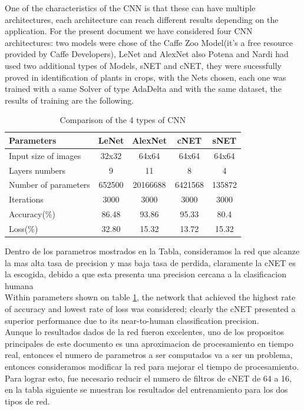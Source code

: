 \documentclass[conference]{IEEEtran}
\begin{document}
One of the characteristics of the CNN is that these can have multiple architectures, each architecture can reach different results depending on the application. For the present document we have considered four CNN architectures: two models were chose of the Caffe Zoo Model(it's a free resource provided by Caffe Developers), LeNet and AlexNet also Potena and Nardi had used two additional types of Models, sNET and cNET, they were sucessfully proved in identification of plants in crops\cite{potena2016fast}, with the Nets chosen, each one was trained with a same Solver of type AdaDelta and with the same dataset, the results of training are the following. \\
\begin{table}[h!]
\centering
\begin{tabular}{|l c c c c|} 
 \hline
 \textbf{Parameters }& \textbf{LeNet} & \textbf{AlexNet} & \textbf{cNET} & \textbf{sNET} \\ [0.75ex] 
 \hline
 Input size of images & 32x32 & 64x64 & 64x64 & 64x64 \\ 
 Layers numbers & 9 & 11 & 8 & 4\\
 Number of parameters & 652500 & 20166688 & 6421568 & 135872 \\ 
 Iterations & 3000 & 3000 & 3000 & 3000 \\ 
  Accuracy(\%) & 86.48 & 93.86 & 95.33 & 80.4 \\
  Loss(\%) & 32.80 & 15.32 & 13.72 & 15.32 \\ [1ex] 
 \hline 
\end{tabular}
\caption{Comparison of the 4 types of CNN}
\label{table:2}
\end{table}

Dentro de los parametros mostrados en la Tabla, consideramos la red que alcanze la mas alta tasa de precision y mas baja tasa de perdida, claramente la cNET es la escogida, debido a que esta presenta una precision cercana a la clasificacion humana\\

Within parameters shown on table \ref{table:2}, the network that achieved the highest rate of accuracy and lowest rate of loss was considered; clearly the cNET presented a superior performance due to its near-to-human classification precision.\\

Aunque lo resultados dados de la red fueron excelentes, uno de los propositos principales de este documento es una aproximacion de procesamiento en tiempo real, entonces el numero de parametros a ser computados va a ser un problema, entonces consideramos modificar la red para mejorar el tiempo de procesamiento. Para lograr esto, fue necesario reducir el numero de filtros de cNET de 64 a 16, en la tabla siguiente se muestran los resultados del entrenamiento para los dos tipos de red. \\
	
\end{document}
